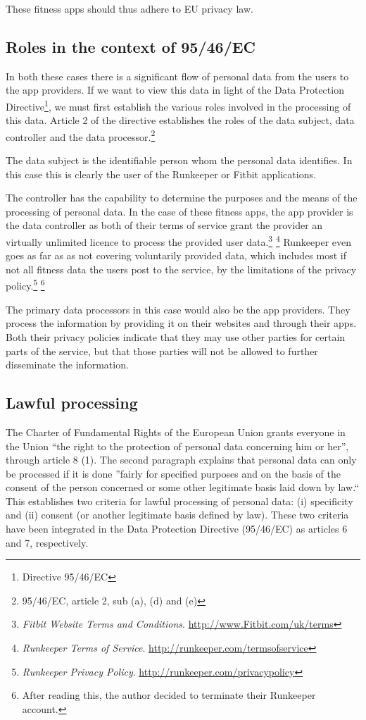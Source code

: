 \documentclass{article}
\begin{document}
These fitness apps should thus adhere to EU privacy law.

\subsection{Roles in the context of 95/46/EC}

In both these cases there is a significant flow of personal data from the users to the app providers.
If we want to view this data in light of the Data Protection Directive\footnote{Directive 95/46/EC}, we must first establish the various roles involved in the processing of this data.
Article 2 of the directive establishes the roles of the data subject, data controller and the data processor.\footnote{95/46/EC, article 2, sub (a), (d) and (e)}

The data subject is the identifiable person whom the personal data identifies.
In this case this is clearly the user of the Runkeeper or Fitbit applications.

The controller has the capability to determine the purposes and the means of the processing of personal data.
In the case of these fitness apps, the app provider is the data controller as both of their terms of service grant the provider an virtually unlimited licence to process the provided user data.\footnote{\emph{Fitbit Website Terms and Conditions}. \url{http://www.Fitbit.com/uk/terms}} \footnote{\emph{Runkeeper Terms of Service}. \url{http://runkeeper.com/termsofservice}}
Runkeeper even goes as far as as not covering voluntarily provided data, which includes most if not all fitness data the users post to the service, by the limitations of the privacy policy.\footnote{\emph{Runkeeper Privacy Policy}. \url{http://runkeeper.com/privacypolicy}} \footnote{After reading this, the author decided to terminate their Runkeeper account.}

The primary data processors in this case would also be the app providers.
They process the information by providing it on their websites and through their apps.
Both their privacy policies indicate that they may use other parties for certain parts of the service, but that those parties will not be allowed to further disseminate the information.

\subsection{Lawful processing}

The Charter of Fundamental Rights of the European Union grants everyone in the Union ``the right to the protection of personal data concerning him or her'', through article 8 (1).
The second paragraph explains that personal data can only be processed if it is done ''fairly for specified purposes and on the basis of the consent of the person concerned or some other legitimate basis laid down by law.``
This establishes two criteria for lawful processing of personal data: (i) specificity and (ii) consent (or another legitimate basis defined by law).
These two criteria have been integrated in the Data Protection Directive (95/46/EC) as articles 6 and 7, respectively.
\end{document}
